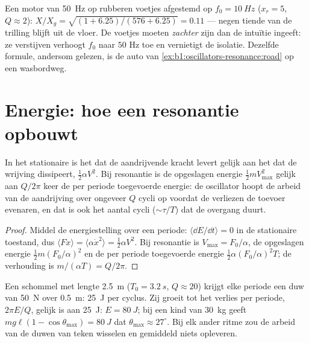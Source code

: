 \begin{example}\label{ex:b1:oscillators-resonance:mounts}
Een motor van \qty{50}{Hz} op rubberen voetjes afgestemd op $f_0 = \qty{10}{Hz}$
($x_r = 5$, $Q \approx 2$): $X/X_g = \sqrt{(1 + 6.25)/(576 + 6.25)} = 0.11$
--- negen tiende van de trilling blijft uit de vloer. De voetjes moeten
\emph{zachter} zijn dan de intuïtie ingeeft: ze verstijven verhoogt $f_0$
naar $50$ Hz toe en vernietigt de isolatie. Dezelfde formule, andersom
gelezen, is de auto van \cref{ex:b1:oscillators-resonance:road} op een
wasbordweg.
\end{example}

\section{Energie: hoe een resonantie opbouwt}

\begin{proposition}\label{prop:b1:oscillators-resonance:energy}
In het stationaire  is het  dat de aandrijvende
kracht levert gelijk aan het  dat de wrijving dissipeert, $\tfrac12\alpha V^2$.
Bij resonantie is de opgeslagen energie $\tfrac12 mV_{\max}^2$ gelijk aan $Q/2\pi$ keer
de per periode toegevoerde energie: de oscillator hoopt de arbeid van de aandrijving
over ongeveer $Q$ cycli op voordat de verliezen de toevoer evenaren, en dat is ook
het aantal cycli ($\sim\tau/T$) dat de overgang duurt.
\end{proposition}

\begin{proof}
Middel de energiestelling over een periode: $\langle\dd E/\dd t\rangle = 0$
in de stationaire toestand, dus $\langle F\dot x\rangle = \langle\alpha\dot x^2\rangle =
\tfrac12\alpha V^2$. Bij resonantie is $V_{\max} = F_0/\alpha$, de opgeslagen energie
$\tfrac12 m(F_0/\alpha)^2$ en de per periode toegevoerde energie $\tfrac12\alpha(F_0/\alpha)^2T$;
de verhouding is $m/(\alpha T) = Q/2\pi$.
\end{proof}

\begin{example}[De schommel]\label{ex:b1:oscillators-resonance:swing}
Een schommel met lengte \qty{2.5}{m} ($T_0 = \qty{3.2}{s}$, $Q \approx 20$) krijgt
elke periode een duw van \qty{50}{N} over \qty{0.5}{m}: \qty{25}{J} per
cyclus. Zij groeit tot het verlies per periode, $2\pi E/Q$, gelijk is aan
\qty{25}{J}: $E = \qty{80}{J}$; bij een kind van \qty{30}{kg} geeft $mg\ell(1 -
\cos\theta_{\max}) = \qty{80}{J}$ dat $\theta_{\max} \approx 27^\circ$.
Bij elk ander ritme zou de arbeid van de duwen van teken wisselen en
gemiddeld niets opleveren.
\end{example}

